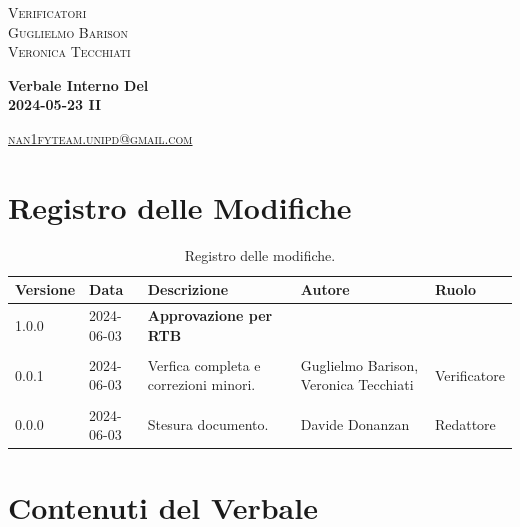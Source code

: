 \documentclass[8pt]{article}
\begin{document}
\begin{titlepage}
\begin{minipage}[t]{0.47\textwidth}
		{\large{\textsc{Verificatori}}
			\vspace{3mm}
			{\\\large{\textsc{Guglielmo Barison}\\}} 
			{\large{\textsc{Veronica Tecchiati}}}
			
		}
		\vspace{4mm}\vspace{4mm}
	\end{minipage}
	\vspace{4cm}
	\begin{center}
		\begin{flushright}
			{\fontsize{30pt}{52pt}\selectfont \textbf{Verbale Interno Del\\2024-05-23 II\\}} %
		\end{flushright}
		\vspace{3cm}
	\end{center}
	\vspace{8.5cm}
	{\small \textsc{\href{mailto: nan1fyteam.unipd@gmail.com}{nan1fyteam.unipd@gmail.com}}}
\end{titlepage}
\pagestyle{mystyle}
\section*{Registro delle Modifiche}
\begin{table}[ht!]	
	\centering
	\begin{tabular}{p{1.2cm} p{2cm} p{6cm} p{3cm} p{2cm}}
		\toprule
		\textbf{Versione}& \textbf{Data} & \textbf{Descrizione} & \textbf{Autore} & \textbf{Ruolo} \\
		\midrule
		1.0.0 & 2024-06-03 & \textbf{Approvazione per RTB} & & \\\\
		0.0.1 & 2024-06-03 & Verfica completa e correzioni minori. & Guglielmo Barison, Veronica Tecchiati & Verificatore \\\\
		0.0.0 & 2024-06-03 & Stesura documento. & Davide Donanzan& Redattore \\
		\bottomrule
	\end{tabular}
	\caption{Registro delle modifiche.}
	\label{table:Registro delle modifiche}
\end{table}
\newpage
\tableofcontents
\clearpage
\newpage
\justifying
\section{Contenuti del Verbale}
\end{document}
